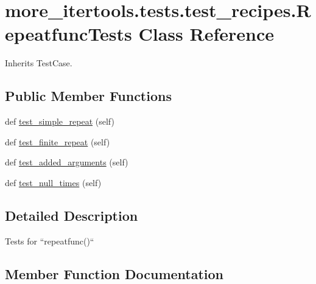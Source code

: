 \hypertarget{classmore__itertools_1_1tests_1_1test__recipes_1_1_repeatfunc_tests}{}\section{more\+\_\+itertools.\+tests.\+test\+\_\+recipes.\+Repeatfunc\+Tests Class Reference}
\label{classmore__itertools_1_1tests_1_1test__recipes_1_1_repeatfunc_tests}


Inherits Test\+Case.

\subsection*{Public Member Functions}
\begin{DoxyCompactItemize}
\item 
def \hyperlink{classmore__itertools_1_1tests_1_1test__recipes_1_1_repeatfunc_tests_a1c598505f1cc7aa61cb987f20faed931}{test\+\_\+simple\+\_\+repeat} (self)
\item 
def \hyperlink{classmore__itertools_1_1tests_1_1test__recipes_1_1_repeatfunc_tests_a644196180e97a7c4acc52ca883d97e83}{test\+\_\+finite\+\_\+repeat} (self)
\item 
def \hyperlink{classmore__itertools_1_1tests_1_1test__recipes_1_1_repeatfunc_tests_ad4663eca62e7e4d175d63abbaf4bf074}{test\+\_\+added\+\_\+arguments} (self)
\item 
def \hyperlink{classmore__itertools_1_1tests_1_1test__recipes_1_1_repeatfunc_tests_ae44985e12c260c8f447db8f55b171097}{test\+\_\+null\+\_\+times} (self)
\end{DoxyCompactItemize}


\subsection{Detailed Description}
\begin{DoxyVerb}Tests for ``repeatfunc()``\end{DoxyVerb}
 

\subsection{Member Function Documentation}
\mbox{\label{classmore__itertools_1_1tests_1_1test__recipes_1_1_repeatfunc_tests_ad4663eca62e7e4d175d63abbaf4bf074}} 

